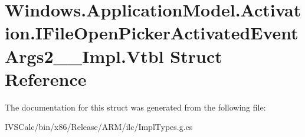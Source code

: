 \hypertarget{struct_windows_1_1_application_model_1_1_activation_1_1_i_file_open_picker_activated_event_args2_____impl_1_1_vtbl}{}\section{Windows.\+Application\+Model.\+Activation.\+I\+File\+Open\+Picker\+Activated\+Event\+Args2\+\_\+\+\_\+\+Impl.\+Vtbl Struct Reference}
\label{struct_windows_1_1_application_model_1_1_activation_1_1_i_file_open_picker_activated_event_args2_____impl_1_1_vtbl}


The documentation for this struct was generated from the following file\+:\begin{DoxyCompactItemize}
\item 
I\+V\+S\+Calc/bin/x86/\+Release/\+A\+R\+M/ilc/Impl\+Types.\+g.\+cs\end{DoxyCompactItemize}
